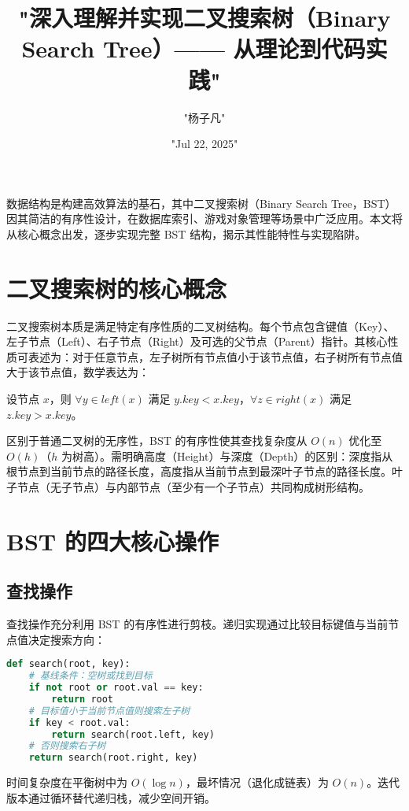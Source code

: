 \title{"深入理解并实现二叉搜索树（Binary Search Tree）—— 从理论到代码实践"}
\author{"杨子凡"}
\date{"Jul 22, 2025"}
\maketitle
数据结构是构建高效算法的基石，其中二叉搜索树（Binary Search Tree，BST）因其简洁的有序性设计，在数据库索引、游戏对象管理等场景中广泛应用。本文将从核心概念出发，逐步实现完整 BST 结构，揭示其性能特性与实现陷阱。\par
\chapter{二叉搜索树的核心概念}
二叉搜索树本质是满足特定有序性质的二叉树结构。每个节点包含键值（Key）、左子节点（Left）、右子节点（Right）及可选的父节点（Parent）指针。其核心性质可表述为：对于任意节点，左子树所有节点值小于该节点值，右子树所有节点值大于该节点值，数学表达为：\par
设节点 $x$，则 $\forall y \in left(x)$ 满足 $y.key < x.key$，$\forall z \in right(x)$ 满足 $z.key > x.key$。\par
区别于普通二叉树的无序性，BST 的有序性使其查找复杂度从 $O(n)$ 优化至 $O(h)$（$h$ 为树高）。需明确高度（Height）与深度（Depth）的区别：深度指从根节点到当前节点的路径长度，高度指从当前节点到最深叶子节点的路径长度。叶子节点（无子节点）与内部节点（至少有一个子节点）共同构成树形结构。\par
\chapter{BST 的四大核心操作}
\section{查找操作}
查找操作充分利用 BST 的有序性进行剪枝。递归实现通过比较目标键值与当前节点值决定搜索方向：\par
\begin{lstlisting}[language=python]
def search(root, key):
    # 基线条件：空树或找到目标
    if not root or root.val == key:
        return root
    # 目标值小于当前节点值则搜索左子树
    if key < root.val:
        return search(root.left, key)
    # 否则搜索右子树
    return search(root.right, key)
\end{lstlisting}
时间复杂度在平衡树中为 $O(\log n)$，最坏情况（退化成链表）为 $O(n)$。迭代版本通过循环替代递归栈，减少空间开销。\par
